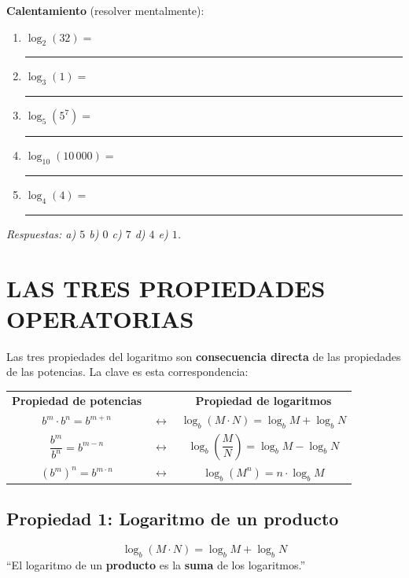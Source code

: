 \documentclass[11pt,a4paper]{article}
\begin{document}
\textbf{Calentamiento} (resolver mentalmente):
\begin{enumerate}[label=\alph*),leftmargin=1cm,itemsep=4pt]
  \item $\log_2(32) = $ \rule{2cm}{0.4pt}
  \item $\log_3(1) = $ \rule{2cm}{0.4pt}
  \item $\log_5(5^{7}) = $ \rule{2cm}{0.4pt}
  \item $\log_{10}(10\,000) = $ \rule{2cm}{0.4pt}
  \item $\log_4(4) = $ \rule{2cm}{0.4pt}
\end{enumerate}

{\small\textit{Respuestas: a) $5$ \; b) $0$ \; c) $7$ \; d) $4$ \; e) $1$.}}

\newpage

\section{LAS TRES PROPIEDADES OPERATORIAS}

Las tres propiedades del logaritmo son \textbf{consecuencia directa} de las propiedades de las potencias. La clave es esta correspondencia:

\begin{tcolorbox}[formula]
\begin{center}
\begin{tabular}{@{}ccc@{}}
\textbf{Propiedad de potencias} & & \textbf{Propiedad de logaritmos} \\[4pt]
$b^{m} \cdot b^{n} = b^{m+n}$ & $\longleftrightarrow$ & $\log_b(M \cdot N) = \log_b M + \log_b N$ \\[6pt]
$\dfrac{b^{m}}{b^{n}} = b^{m-n}$ & $\longleftrightarrow$ & $\log_b\!\left(\dfrac{M}{N}\right) = \log_b M - \log_b N$ \\[8pt]
$(b^{m})^{n} = b^{m \cdot n}$ & $\longleftrightarrow$ & $\log_b(M^{n}) = n \cdot \log_b M$ \\
\end{tabular}
\end{center}
\end{tcolorbox}

\subsection{Propiedad 1: Logaritmo de un producto}

\begin{tcolorbox}[propiedad, title={Propiedad del producto}]
\[
  \boxed{\;\log_b(M \cdot N) = \log_b M + \log_b N\;}
\]
``El logaritmo de un \textbf{producto} es la \textbf{suma} de los logaritmos.''
\end{tcolorbox}
\end{document}

